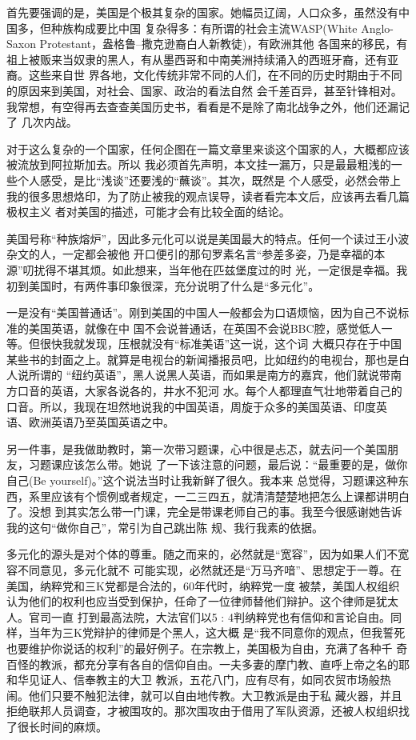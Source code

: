 ﻿\documentclass[11pt]{article}
\begin{document}
首先要强调的是，美国是个极其复杂的国家。她幅员辽阔，人口众多，虽然没有中国多，但种族构成要比中国
复杂得多：有所谓的社会主流WASP(White Anglo-Saxon Protestant，盎格鲁--撒克逊裔白人新教徒)，有欧洲其他
各国来的移民，有祖上被贩来当奴隶的黑人，有从墨西哥和中南美洲持续涌入的西班牙裔，还有亚裔。这些来自世
界各地，文化传统非常不同的人们，在不同的历史时期由于不同的原因来到美国，对社会、国家、政治的看法自然
会千差百异，甚至针锋相对。我常想，有空得再去查查美国历史书，看看是不是除了南北战争之外，他们还漏记了
几次内战。

对于这么复杂的一个国家，任何企图在一篇文章里来谈这个国家的人，大概都应该被流放到阿拉斯加去。所以
我必须首先声明，本文挂一漏万，只是最最粗浅的一些个人感受，是比``浅谈''还要浅的``蘸谈''。其次，既然是
个人感受，必然会带上我的很多思想烙印，为了防止被我的观点误导，读者看完本文后，应该再去看几篇极权主义
者对美国的描述，可能才会有比较全面的结论。

美国号称``种族熔炉''，因此多元化可以说是美国最大的特点。任何一个读过王小波杂文的人，一定都会被他
开口便引的那句罗素名言``参差多姿，乃是幸福的本源''叨扰得不堪其烦。如此想来，当年他在匹兹堡度过的时
光，一定很是幸福。我初到美国时，有两件事印象很深，充分说明了什么是``多元化''。

一是没有``美国普通话''。刚到美国的中国人一般都会为口语烦恼，因为自己不说标准的美国英语，就像在中
国不会说普通话，在英国不会说BBC腔，感觉低人一等。但很快我就发现，压根就没有``标准美语''这一说，这个词
大概只存在于中国某些书的封面之上。就算是电视台的新闻播报员吧，比如纽约的电视台，那也是白人说所谓的
``纽约英语''，黑人说黑人英语，而如果是南方的嘉宾，他们就说带南方口音的英语，大家各说各的，井水不犯河
水。每个人都理直气壮地带着自己的口音。所以，我现在坦然地说我的中国英语，周旋于众多的美国英语、印度英
语、欧洲英语乃至英国英语之中。

另一件事，是我做助教时，第一次带习题课，心中很是忐忑，就去问一个美国朋友，习题课应该怎么带。她说
了一下该注意的问题，最后说：``最重要的是，做你自己(Be yourself)。''这个说法当时让我新鲜了很久。我本来
总觉得，习题课这种东西，系里应该有个惯例或者规定，一二三四五，就清清楚楚地把怎么上课都讲明白了。没想
到其实怎么带一门课，完全是带课老师自己的事。我至今很感谢她告诉我的这句``做你自己''，常引为自己跳出陈
规、我行我素的依据。

多元化的源头是对个体的尊重。随之而来的，必然就是``宽容''，因为如果人们不宽容不同意见，多元化就不
可能实现，必然就还是``万马齐喑''、思想定于一尊。在美国，纳粹党和三K党都是合法的，60年代时，纳粹党一度
被禁，美国人权组织认为他们的权利也应当受到保护，任命了一位律师替他们辩护。这个律师是犹太人。官司一直
打到最高法院，大法官们以5 : 4判纳粹党也有信仰和言论自由。同样，当年为三K党辩护的律师是个黑人，这大概
是``我不同意你的观点，但我誓死也要维护你说话的权利''的最好例子。在宗教上，美国极为自由，充满了各种千
奇百怪的教派，都充分享有各自的信仰自由。一夫多妻的摩门教、直呼上帝之名的耶和华见证人、信奉教主的大卫
教派，五花八门，应有尽有，如同农贸市场般热闹。他们只要不触犯法律，就可以自由地传教。大卫教派是由于私
藏火器，并且拒绝联邦人员调查，才被围攻的。那次围攻由于借用了军队资源，还被人权组织找了很长时间的麻烦。
\end{document}

